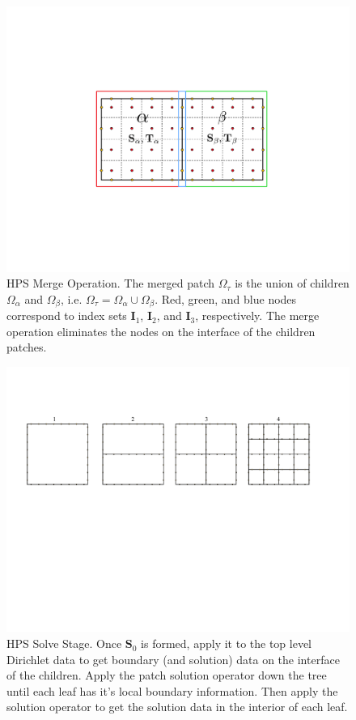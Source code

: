 \begin{figure}
    \centering
    \includegraphics[width=0.7\columnwidth]{figures/merge_figure.pdf}
    \caption{HPS Merge Operation. The merged patch $\Omega_{\tau}$ is the union of children $\Omega_{\alpha}$ and $\Omega_{\beta}$, i.e. $\Omega_{\tau} = \Omega_{\alpha} \cup \Omega_{\beta}$. Red, green, and blue nodes correspond to index sets $\textbf{I}_1$, $\textbf{I}_2$, and $\textbf{I}_3$, respectively. The merge operation eliminates the nodes on the interface of the children patches.}
    \label{fig:merge}
\end{figure}

\begin{figure}
    \centering
    \includegraphics[width=\columnwidth]{figures/solve_figure.pdf}
    \caption{HPS Solve Stage. Once $\textbf{S}_0$ is formed, apply it to the top level Dirichlet data to get boundary (and solution) data on the interface of the children. Apply the patch solution operator down the tree until each leaf has it's local boundary information. Then apply the solution operator to get the solution data in the interior of each leaf.}
    \label{fig:solve}
\end{figure}


